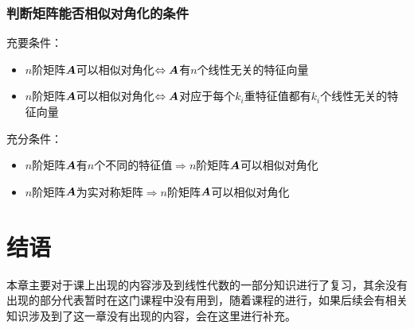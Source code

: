 \documentclass[12pt, a4paper, oneside, UTF8]{ctexbook}
\begin{document}
\subsubsection{判断矩阵能否相似对角化的条件}
\noindent
充要条件：
\begin{itemize}
    \item $n$阶矩阵$\boldsymbol{A}$可以相似对角化$\Leftrightarrow \boldsymbol{A}$有$n$个线性无关的特征向量
    \item $n$阶矩阵$\boldsymbol{A}$可以相似对角化$\Leftrightarrow \boldsymbol{A}$对应于每个$k_i$重特征值都有$k_i$个线性无关的特征向量
\end{itemize}
充分条件：
\begin{itemize}
    \item $n$阶矩阵$\boldsymbol{A}$有$n$个不同的特征值$\Rightarrow n$阶矩阵$\boldsymbol{A}$可以相似对角化
    \item $n$阶矩阵$\boldsymbol{A}$为实对称矩阵$\Rightarrow n$阶矩阵$\boldsymbol{A}$可以相似对角化
\end{itemize}
\section{结语}
本章主要对于课上出现的内容涉及到线性代数的一部分知识进行了复习，其余没有出现的部分代表暂时在这门课程中没有用到，随着课程的进行，如果后续会有相关知识涉及到了这一章没有出现的内容，会在这里进行补充。
\ifx\allfiles\undefined
\end{document}
